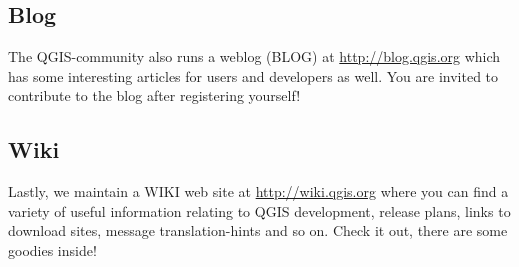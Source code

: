 
\subsection{Blog}
The QGIS-community also runs a weblog (BLOG) at \url{http://blog.qgis.org} 
which has some interesting articles for users and developers as well. 
You are invited to contribute to the blog after registering yourself!

\subsection{Wiki}
Lastly, we maintain a WIKI web site at \url{http://wiki.qgis.org} where you 
can find a variety of useful information relating to QGIS development, 
release plans, links to download sites, message translation-hints and so on. 
Check it out, there are some goodies inside!

